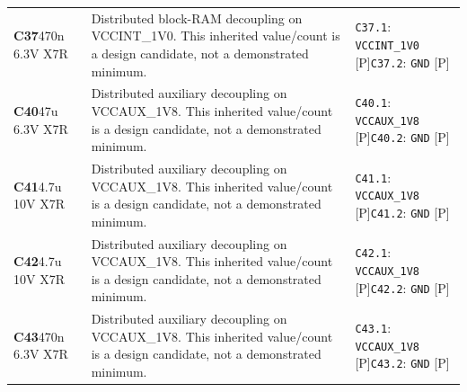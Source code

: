 \documentclass[11pt,a4paper]{article}
\begin{document}
\begin{longtable}{@{}P{27mm}P{83mm}P{58mm}@{}}
\textbf{C37}\newline 470n 6.3V X7R & Distributed block-RAM decoupling on VCCINT\_1V0. This inherited value/count is a design candidate, not a demonstrated minimum. & \nolinkurl{C37.1}: \nolinkurl{VCCINT_1V0} [P]\newline \nolinkurl{C37.2}: \nolinkurl{GND} [P] \\
\textbf{C40}\newline 47u 6.3V X7R & Distributed auxiliary decoupling on VCCAUX\_1V8. This inherited value/count is a design candidate, not a demonstrated minimum. & \nolinkurl{C40.1}: \nolinkurl{VCCAUX_1V8} [P]\newline \nolinkurl{C40.2}: \nolinkurl{GND} [P] \\
\textbf{C41}\newline 4.7u 10V X7R & Distributed auxiliary decoupling on VCCAUX\_1V8. This inherited value/count is a design candidate, not a demonstrated minimum. & \nolinkurl{C41.1}: \nolinkurl{VCCAUX_1V8} [P]\newline \nolinkurl{C41.2}: \nolinkurl{GND} [P] \\
\textbf{C42}\newline 4.7u 10V X7R & Distributed auxiliary decoupling on VCCAUX\_1V8. This inherited value/count is a design candidate, not a demonstrated minimum. & \nolinkurl{C42.1}: \nolinkurl{VCCAUX_1V8} [P]\newline \nolinkurl{C42.2}: \nolinkurl{GND} [P] \\
\textbf{C43}\newline 470n 6.3V X7R & Distributed auxiliary decoupling on VCCAUX\_1V8. This inherited value/count is a design candidate, not a demonstrated minimum. & \nolinkurl{C43.1}: \nolinkurl{VCCAUX_1V8} [P]\newline \nolinkurl{C43.2}: \nolinkurl{GND} [P] \\

\end{longtable}
\end{document}
